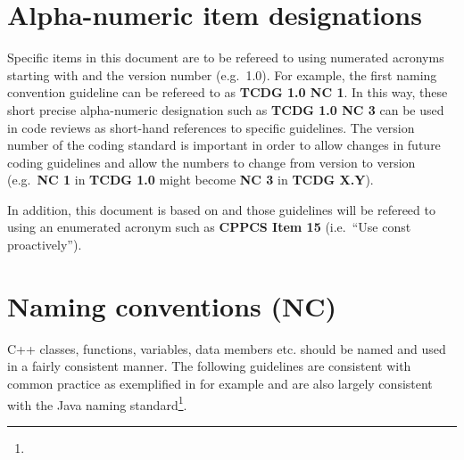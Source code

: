 %
\section{Alpha-numeric item designations}
\label{sec:alpha_numeric_designations}
%

Specific items in this document are to be refereed to using numerated acronyms
starting with {}\textbf{} and the version number (e.g.\ 1.0).  For
example, the first naming convention guideline can be refereed to as
{}\textbf{TCDG 1.0 NC 1}.  In this way, these short precise alpha-numeric
designation such as {}\textbf{TCDG 1.0 NC 3} can be used in code reviews as
short-hand references to specific guidelines.  The version number of the
coding standard is important in order to allow changes in future coding
guidelines and allow the numbers to change from version to version (e.g.\
{}\textbf{NC 1} in {}\textbf{TCDG 1.0} might become {}\textbf{NC 3} in
{}\textbf{TCDG X.Y}).

In addition, this document is based on {}\cite{C++CodingStandards05}
and those guidelines will be refereed to using an enumerated acronym
such as {}\textbf{CPPCS Item 15} (i.e.\ ``Use const proactively'').

%
\section{Naming conventions (NC)}
\label{sec:NamingConventions}
%

C++ classes, functions, variables, data members etc. should be named
and used in a fairly consistent manner.  The following guidelines are
consistent with common practice as exemplified in
{}\cite{EffectiveC++3rd05} for example and are also largely consistent
with the Java naming
standard\footnote{}.


